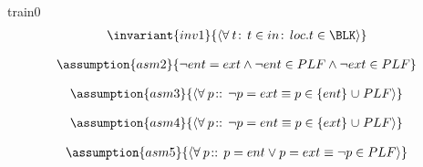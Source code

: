 \documentclass[12pt]{amsart}
\begin{document}
\begin{machine}{train0}
\begin{align*}
\invariant{inv1}
{	\qforall{t}{t \in in}{loc.t \in \BLK}	}
\end{align*}

\begin{align*}\assumption{asm2}
{	\neg ent = ext \land \neg ent \in PLF \land \neg ext \in PLF	}
\end{align*}

\begin{align*}\assumption{asm3}
{	\qforall{p}{}{ \neg p = ext \equiv p \in \{ent\} \bunion PLF }	}
\end{align*}

\begin{align*}\assumption{asm4}
{	\qforall{p}{}{ \neg p = ent \equiv p \in \{ext\} \bunion PLF }	}
\end{align*}

\begin{align*}\assumption{asm5}
{	\qforall{p}{}{ p = ent \lor p = ext \equiv \neg p \in PLF }	}
\end{align*}


\end{machine}
\end{document}
